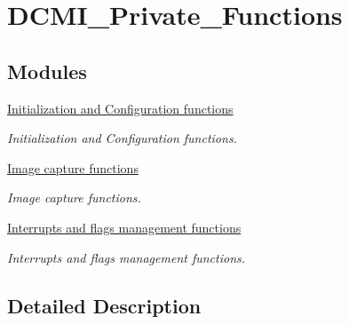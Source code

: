 \hypertarget{group___d_c_m_i___private___functions}{\section{D\-C\-M\-I\-\_\-\-Private\-\_\-\-Functions}
\label{group___d_c_m_i___private___functions}
}
\subsection*{Modules}
\begin{DoxyCompactItemize}
\item 
\hyperlink{group___d_c_m_i___group1}{Initialization and Configuration functions}
\begin{DoxyCompactList}\small\item\em Initialization and Configuration functions. \end{DoxyCompactList}\item 
\hyperlink{group___d_c_m_i___group2}{Image capture functions}
\begin{DoxyCompactList}\small\item\em Image capture functions. \end{DoxyCompactList}\item 
\hyperlink{group___d_c_m_i___group3}{Interrupts and flags management functions}
\begin{DoxyCompactList}\small\item\em Interrupts and flags management functions. \end{DoxyCompactList}\end{DoxyCompactItemize}


\subsection{Detailed Description}
